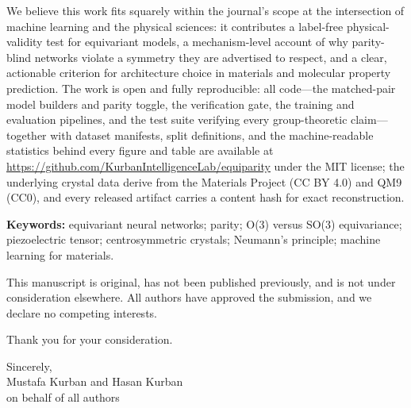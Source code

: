 \documentclass[11pt]{article}
\begin{document}
We believe this work fits squarely within the journal's scope at the intersection of machine learning and the physical sciences: it contributes a label-free physical-validity test for equivariant models, a mechanism-level account of why parity-blind networks violate a symmetry they are advertised to respect, and a clear, actionable criterion for architecture choice in materials and molecular property prediction. The work is open and fully reproducible: all code---the matched-pair model builders and parity toggle, the verification gate, the training and evaluation pipelines, and the test suite verifying every group-theoretic claim---together with dataset manifests, split definitions, and the machine-readable statistics behind every figure and table are available at \url{https://github.com/KurbanIntelligenceLab/equiparity} under the MIT license; the underlying crystal data derive from the Materials Project (CC BY 4.0) and QM9 (CC0), and every released artifact carries a content hash for exact reconstruction.

\textbf{Keywords:} equivariant neural networks; parity; O(3) versus SO(3) equivariance; piezoelectric tensor; centrosymmetric crystals; Neumann's principle; machine learning for materials.

This manuscript is original, has not been published previously, and is not under consideration elsewhere. All authors have approved the submission, and we declare no competing interests.

Thank you for your consideration.

Sincerely,\\
Mustafa Kurban and Hasan Kurban\\
on behalf of all authors
\end{document}
